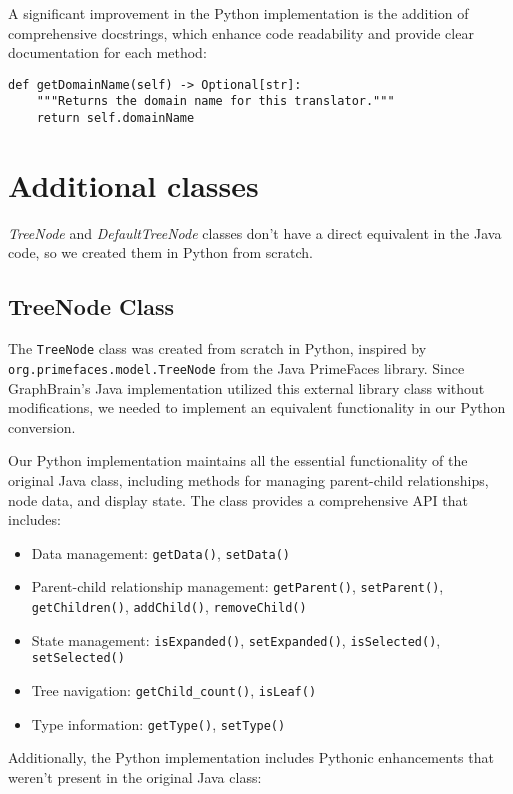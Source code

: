 \documentclass[12pt,a4paper]{article}
\begin{document}
A significant improvement in the Python implementation is the addition of comprehensive docstrings, which enhance code readability and provide clear documentation for each method:

\begin{verbatim}
def getDomainName(self) -> Optional[str]:
    """Returns the domain name for this translator."""
    return self.domainName
\end{verbatim}

\section{Additional classes}
\textit{TreeNode} and \textit{DefaultTreeNode} classes don't have a direct equivalent in the Java code, so we created them in Python from scratch.

\subsection{TreeNode Class}
The \texttt{TreeNode} class was created from scratch in Python, inspired by \texttt{org.primefaces.model.TreeNode} from the Java PrimeFaces library. Since GraphBrain's Java implementation utilized this external library class without modifications, we needed to implement an equivalent functionality in our Python conversion.

Our Python implementation maintains all the essential functionality of the original Java class, including methods for managing parent-child relationships, node data, and display state. The class provides a comprehensive API that includes:

\begin{itemize}
    \item Data management: \texttt{getData()}, \texttt{setData()}
    \item Parent-child relationship management: \texttt{getParent()}, \texttt{setParent()}, \texttt{getChildren()}, \texttt{addChild()}, \texttt{removeChild()}
    \item State management: \texttt{isExpanded()}, \texttt{setExpanded()}, \texttt{isSelected()}, \texttt{setSelected()}
    \item Tree navigation: \texttt{getChild\_count()}, \texttt{isLeaf()}
    \item Type information: \texttt{getType()}, \texttt{setType()}
\end{itemize}

Additionally, the Python implementation includes Pythonic enhancements that weren't present in the original Java class:
\end{document}
